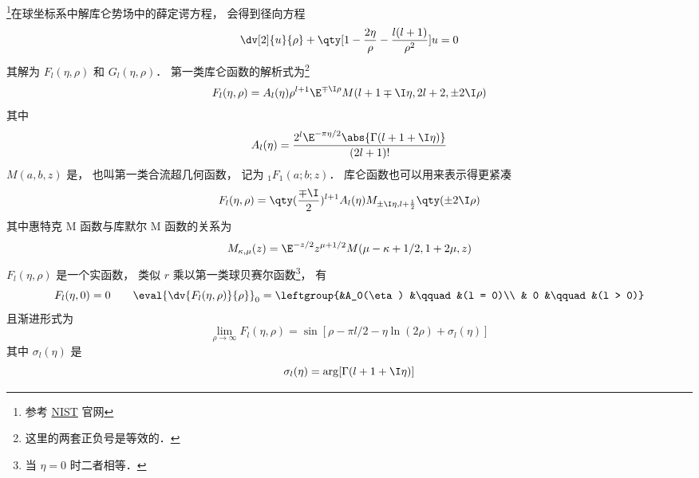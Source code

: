 
\footnote{参考 \href{https://dlmf.nist.gov/33.2}{\color{blue}NIST} 官网}在球坐标系中解库仑势场中的薛定谔方程， %
会得到径向方程
\begin{equation}
\dv[2]{u}{\rho} + \qty[1 - \frac{2\eta}{\rho} - \frac{l(l+1)}{\rho^2}]u = 0
\end{equation}
其解为 $F_l(\eta, \rho)$ 和 $G_l(\eta, \rho)$． 第一类库仑函数的解析式为\footnote{这里的两套正负号是等效的．}
\begin{equation}
F_l(\eta, \rho) = A_l(\eta) \rho^{l+1} \E^{\mp\I\rho} M(l+1\mp\I\eta, 2l+2, \pm 2\I\rho)
\end{equation}
其中
\begin{equation}
A_l(\eta) = \frac{2^l \E^{-\pi\eta/2} \abs{\Gamma(l+1+\I\eta)}}{(2l+1)!}
\end{equation}
$M(a, b, z)$ 是， 也叫第一类合流超几何函数， 记为 $_1 F_1(a;b;z)$． 库仑函数也可以用来表示得更紧凑
\begin{equation}
F_l(\eta, \rho) = \qty(\frac{\mp\I}{2})^{l+1} A_l(\eta) M_{\pm\I\eta, l+\frac12}\qty(\pm 2\I\rho)
\end{equation}
其中惠特克 M 函数与库默尔 M 函数的关系为
\begin{equation}
M_{\kappa, \mu}(z) = \E^{-z/2} z^{\mu + 1/2} M(\mu - \kappa + 1/2, 1 + 2\mu, z)
\end{equation}
$F_l(\eta, \rho)$ 是一个实函数， 类似 $r$ 乘以第一类球贝赛尔函数\footnote{当 $\eta = 0$ 时二者相等．}， 有
\begin{equation}
F_l(\eta, 0) = 0 \qquad \eval{\dv{F_l(\eta, \rho)}{\rho}}_0 = 
\leftgroup{&A_0(\eta) &\qquad &(l = 0)\\ & 0 &\qquad &(l > 0)}
\end{equation}
且渐进形式为
\begin{equation}\label{CulmF_eq7}
\lim_{\rho\to \infty} F_l(\eta, \rho) = \sin[\rho - \pi l/2 - \eta\ln(2\rho) + \sigma_l(\eta)]
\end{equation}
其中 $\sigma_l(\eta)$ 是
\begin{equation}
\sigma_l(\eta) = \arg[\Gamma(l+1+\I\eta)]
\end{equation}

